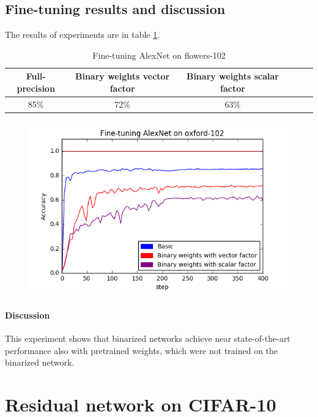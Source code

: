 \documentclass[licencjacka]{pracamgr}
\begin{document}
		\subsection{Fine-tuning results and discussion}
		     
		        The results of experiments are in table \ref{table:1}.
		        \begin{table}[H]
                    \caption{Fine-tuning AlexNet on flowers-102}
                    \centering
                    \begin{tabular}{c c c c c c}
                    \hline\hline
			    Full-precision & Binary weights vector factor & Binary weights scalar factor \\ [0.5ex]
                    \hline
			    85\% & 72\% & 63\% \\
                    \hline
                    \end{tabular}
                    \label{table:1}
	            \end{table}
	            \begin{figure}[h]
				\centering
				\includegraphics[width=\textwidth]{images/Fine-tuning-AlexNet}
		    \end{figure}
		        \paragraph{Discussion} 
			This experiment shows that binarized networks achieve near state-of-the-art performance also with pretrained weights, which were not trained on the binarized network.
	\section{Residual network on CIFAR-10}
\end{document}
